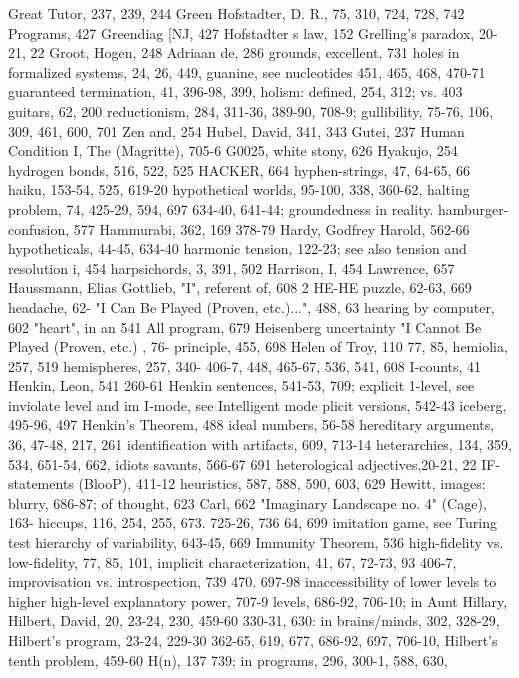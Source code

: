 Great Tutor, 237, 239, 244 Green             Hofstadter, D. R., 75, 310, 724, 728, 742
Programs, 427 Greendiag [NJ, 427             Hofstadter s law, 152
Grelling's paradox, 20-21, 22 Groot,         Hogen, 248
Adriaan de, 286 grounds, excellent, 731      holes in formalized systems, 24, 26, 449,
guanine, see nucleotides                     451, 465, 468, 470-71
guaranteed termination, 41, 396-98, 399,     holism:     defined,    254,     312;     vs.
403 guitars, 62, 200                         reductionism, 284, 311-36, 389-90, 708-9;
gullibility, 75-76, 106, 309, 461, 600, 701  Zen and, 254 Hubel, David, 341, 343
Gutei, 237                                   Human Condition I, The (Magritte), 705-6
G0025, white stony, 626                      Hyakujo, 254
                                             hydrogen bonds, 516, 522, 525
HACKER, 664                                  hyphen-strings, 47, 64-65, 66
haiku, 153-54, 525, 619-20                   hypothetical worlds, 95-100, 338, 360-62,
halting problem, 74, 425-29, 594, 697 634-40, 641-44; groundedness in reality.
hamburger-confusion, 577 Hammurabi, 362,
169                                          378-79
Hardy, Godfrey Harold, 562-66                hypotheticals, 44-45, 634-40
harmonic tension, 122-23; see also tension
and resolution                               i, 454
harpsichords, 3, 391, 502 Harrison, I, 454
Lawrence, 657 Haussmann, Elias Gottlieb, "I", referent of, 608
2 HE-HE puzzle, 62-63, 669 headache, 62- "I Can Be Played (Proven, etc.)...", 488,
63 hearing by computer, 602 "heart", in an 541
All program, 679 Heisenberg uncertainty "I Cannot Be Played (Proven, etc.) , 76-
principle, 455, 698 Helen of Troy, 110       77, 85,
hemiolia, 257, 519 hemispheres, 257, 340- 406-7, 448, 465-67, 536, 541, 608 I-counts,
41 Henkin, Leon, 541                         260-61
Henkin sentences, 541-53, 709; explicit 1-level, see inviolate level
and im                                       I-mode, see Intelligent mode
plicit versions, 542-43                      iceberg, 495-96, 497
Henkin's Theorem, 488                        ideal numbers, 56-58
hereditary arguments, 36, 47-48, 217, 261 identification with artifacts, 609, 713-14
heterarchies, 134, 359, 534, 651-54, 662, idiots savants, 566-67
691 heterological adjectives,20-21, 22 IF-statements (BlooP), 411-12
heuristics, 587, 588, 590, 603, 629 Hewitt, images: blurry, 686-87; of thought, 623
Carl, 662                                    "Imaginary Landscape no. 4" (Cage), 163-
hiccups, 116, 254, 255, 673. 725-26, 736 64, 699 imitation game, see Turing test
hierarchy of variability, 643-45, 669        Immunity Theorem, 536
high-fidelity vs. low-fidelity, 77, 85, 101, implicit characterization, 41, 67, 72-73, 93
406-7,                                       improvisation vs. introspection, 739
470. 697-98                                  inaccessibility of lower levels to higher
high-level explanatory power, 707-9 levels, 686-92, 706-10; in Aunt Hillary,
Hilbert, David, 20, 23-24, 230, 459-60 330-31, 630: in brains/minds, 302, 328-29,
Hilbert's program, 23-24, 229-30             362-65, 619, 677, 686-92, 697, 706-10,
Hilbert's tenth problem, 459-60 H(n), 137    739; in programs, 296, 300-1, 588, 630,




